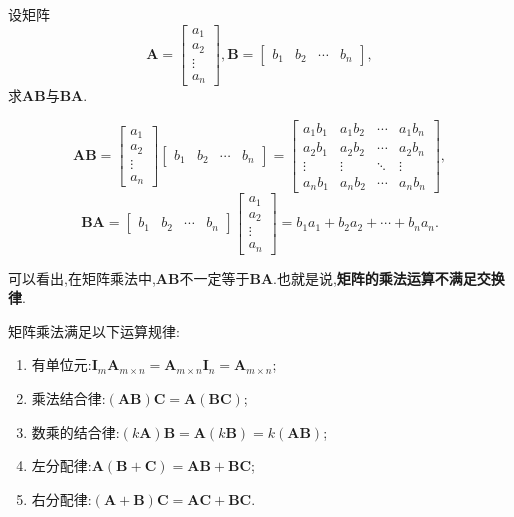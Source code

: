 \begin{example}
	设矩阵\[
		\mathbf{A}=
		\begin{bmatrix}
			a_{1}  \\
			a_{2}  \\
			\vdots \\
			a_{n}
		\end{bmatrix}  ,
		\mathbf{B}=
		\begin{bmatrix}
			b_{1} & b_{2} & \cdots & b_{n}
		\end{bmatrix}  ,
	\]
	求$\mathbf{AB}$与$\mathbf{BA}$.
\end{example}
\begin{solution}
	\[
		\mathbf{AB}=\begin{bmatrix}
			a_{1}  \\
			a_{2}  \\
			\vdots \\
			a_{n}
		\end{bmatrix}
		\begin{bmatrix}
			b_{1} & b_{2} & \cdots & b_{n}
		\end{bmatrix}
		=\begin{bmatrix}
			a_{1}b_1 & a_{1}b_2 & \cdots & a_{1}b_n \\
			a_{2}b_1 & a_{2}b_2 & \cdots & a_{2}b_n \\
			\vdots   & \vdots   & \ddots & \vdots   \\
			a_{n}b_1 & a_{n}b_2 & \cdots & a_{n}b_n
		\end{bmatrix}  ,
	\]\[
		\mathbf{BA}=\begin{bmatrix}
			b_{1} & b_{2} & \cdots & b_{n}
		\end{bmatrix}
		\begin{bmatrix}
			a_{1}  \\
			a_{2}  \\
			\vdots \\
			a_{n}
		\end{bmatrix}
		=b_1a_1+b_2a_2+\cdots +b_na_n.
	\]
\end{solution}

可以看出,在矩阵乘法中,$\mathbf{AB}$不一定等于$\mathbf{BA}$.也就是说,\textbf{矩阵的乘法运算不满足交换律}.

矩阵乘法满足以下运算规律:
\begin{enumerate}
	\item 有单位元:$\mathbf{I}_m \mathbf{A}_{m\times n}=\mathbf{A}_{m\times n}\mathbf{I}_n=\mathbf{A}_{m\times n}$;
	\item 乘法结合律:$\mathbf{(AB)C=A(BC)}$;
	\item 数乘的结合律:$(k\mathbf{A})\mathbf{B}=\mathbf{A}(k\mathbf{B})=k\mathbf{(AB)}$;
	\item 左分配律:$\mathbf{A(B+C)=AB+BC}$;
	\item 右分配律:$\mathbf{(A+B)C=AC+BC}$.
\end{enumerate}

